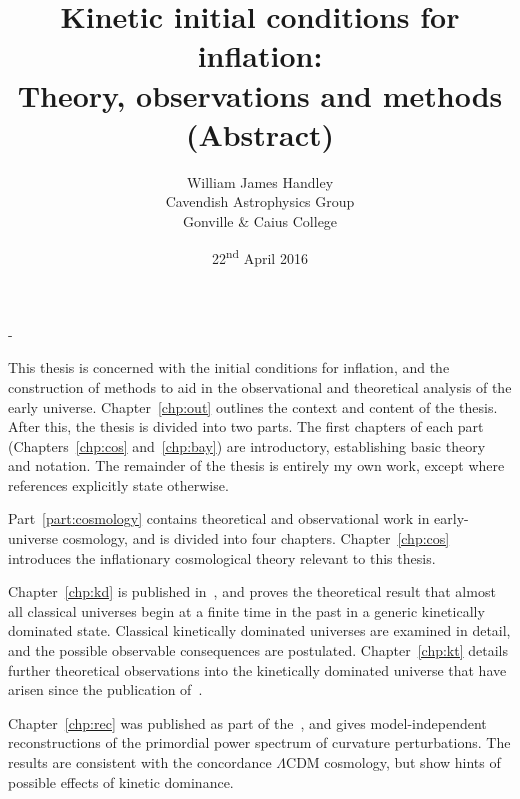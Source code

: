 \title{%
  {\Huge Kinetic initial conditions for inflation:}\\ 
  {\huge Theory, observations and methods} \\
  {\large (Abstract)}
}

\author{William James Handley\\
Cavendish Astrophysics Group \\
Gonville \& Caius College}
\date{22\textsuperscript{nd} April 2016}

\calccentering{\unitlength}                         %
\begin{adjustwidth*}{\unitlength}{-\unitlength}     %

\setlength{\droptitle}{-60pt}

\thispagestyle{empty}
  \begin{titlingpage}
    \maketitle
    \noindent
This thesis is concerned with the initial conditions for inflation, and the construction of methods to aid in the observational and theoretical analysis of the early universe.
Chapter~\ref{chp:out} outlines the context and content of the thesis. After this, the thesis is divided into two parts.
The first chapters of each part (Chapters~\ref{chp:cos} and~\ref{chp:bay}) are introductory, establishing basic theory and notation. The remainder of the thesis is entirely my own work, except where references explicitly state otherwise.

Part~\ref{part:cosmology} contains theoretical and observational work in early-universe cosmology, and is divided into four chapters. 
Chapter~\ref{chp:cos} introduces the inflationary cosmological theory relevant to this thesis. 

Chapter~\ref{chp:kd} is published in~\cite{Handley+2014}, and proves the theoretical result that almost all classical universes begin at a finite time in the past in a generic kinetically dominated state. Classical kinetically dominated universes are examined in detail, and the possible observable consequences are postulated. 
Chapter~\ref{chp:kt} details further theoretical observations into the kinetically dominated universe that have arisen since the publication of~\cite{Handley+2014}. 

Chapter~\ref{chp:rec} was published as part of the~\cite{planck2015-a24}, and gives model-independent reconstructions of the primordial power spectrum of curvature perturbations. The results are consistent with the concordance $\Lambda$CDM cosmology, but show hints of possible effects of kinetic dominance.


\end{titlingpage}
\end{adjustwidth*}
